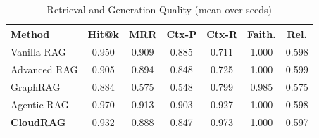 \begin{table}[!htbp]
\centering
\caption{Retrieval and Generation Quality (mean over seeds)}
\label{tab:retrieval}
\footnotesize
\begin{tabular*}{\columnwidth}{@{\extracolsep{\fill}}lcccccc@{}}
\toprule
Method & Hit@k & MRR & Ctx-P & Ctx-R & Faith. & Rel. \\
\midrule
Vanilla RAG & 0.950 & 0.909 & 0.885 & 0.711 & 1.000 & 0.598 \\
Advanced RAG & 0.905 & 0.894 & 0.848 & 0.725 & 1.000 & 0.599 \\
GraphRAG & 0.884 & 0.575 & 0.548 & 0.799 & 0.985 & 0.575 \\
Agentic RAG & 0.970 & 0.913 & 0.903 & 0.927 & 1.000 & 0.598 \\
\textbf{CloudRAG} & 0.932 & 0.888 & 0.847 & 0.973 & 1.000 & 0.597 \\
\bottomrule
\end{tabular*}
\end{table}
